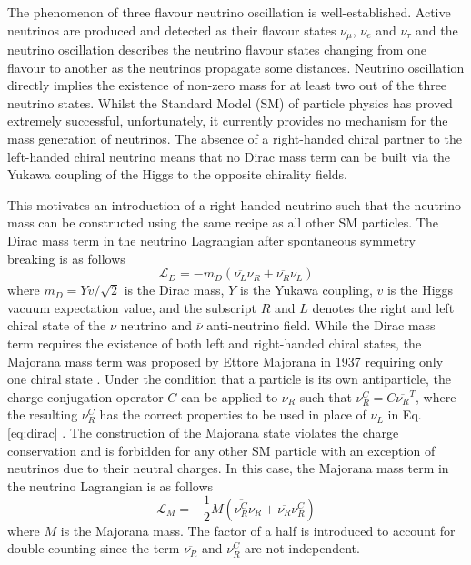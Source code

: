 
The phenomenon of three flavour neutrino oscillation is well-established.
Active neutrinos are produced and detected as their flavour states $\nu_\mu$, $\nu_e$ and $\nu_\tau$ and the neutrino oscillation describes the neutrino flavour states changing from one flavour to another as the neutrinos propagate some distances.
Neutrino oscillation directly implies the existence of non-zero mass for at least two out of the three neutrino states.
Whilst the Standard Model (SM) of particle physics has proved extremely successful, unfortunately, it currently provides no mechanism for the mass generation of neutrinos.
The absence of a right-handed chiral partner to the left-handed chiral neutrino means that no Dirac mass term can be built via the Yukawa coupling of the Higgs to the opposite chirality fields.


This motivates an introduction of a right-handed neutrino such that the neutrino mass can be constructed using the same recipe as all other SM particles.
The Dirac mass term in the neutrino Lagrangian after spontaneous symmetry breaking is as follows \cite{Thomson}
\begin{equation}
\mathcal{L}_{D} = -m_{D} (\overline{\nu_{L}}\nu_{R} + \overline{\nu_{R}}\nu_{L}) 
\label{eq:dirac}
\end{equation}
where $m_{D} = Yv/\sqrt{2}$ is the Dirac mass, $Y$ is the Yukawa coupling, $v$ is the Higgs vacuum expectation value, and the subscript $R$ and $L$ denotes the right and left chiral state of the $\nu$ neutrino and $\overline{\nu}$ anti-neutrino field. 
While the Dirac mass term requires the existence of both left and right-handed chiral states, the Majorana mass term was proposed by Ettore Majorana in 1937 requiring only one chiral state \cite{Majorana}.
Under the condition that a particle is its own antiparticle, the charge conjugation operator $C$ can be applied to $\nu_R$ such that $\nu^{C}_{R}=C\overline{\nu_{R}}^{T}$, where the resulting $\nu_R^C$ has the correct properties to be used in place of $\nu_L$ in Eq. \ref{eq:dirac} \cite{Kim}.
The construction of the Majorana state violates the charge conservation and is forbidden for any other SM particle with an exception of neutrinos due to their neutral charges. 
In this case, the Majorana mass term in the neutrino Lagrangian is as follows \cite{Kim}
\begin{equation}
	\mathcal{L}_{M} = -\frac{1}{2}M(\overline{\nu_{R}^{C}}\nu_{R} + \overline{\nu_{R}}\nu_{R}^{C})
\end{equation}
where $M$ is the Majorana mass. 
The factor of a half is introduced to account for double counting since the term $\overline{\nu_R}$ and $\nu^C_R$ are not independent.

